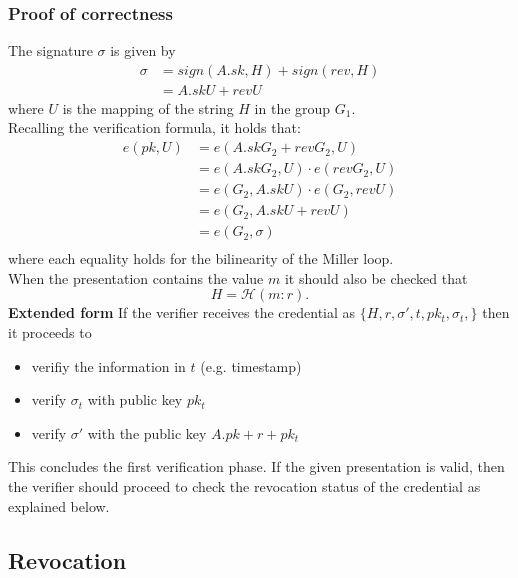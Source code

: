 \subsubsection{Proof of correctness}
The signature $\sigma$ is given by
\begin{equation*}
\begin{split}
    \sigma &= sign(A.sk, H) + sign(rev, H) \\
     &= A.sk U + rev U
\end{split}
\end{equation*}
where $U$ is the mapping of the string $H$ in the group $G_1$.\\
Recalling the verification formula, it holds that:
\begin{equation*}
\begin{split}
 e(pk, U) &= e(A.skG_2 + revG_2, U) \\
 &= e(A.skG_2, U) \cdot e(revG_2, U) \\
 &= e(G_2, A.sk U) \cdot e(G_2, rev U) \\
 &= e(G_2, A.sk U + rev U) \\
 &= e(G_2, \sigma) \\
\end{split}
\end{equation*}
where each equality holds for the bilinearity of the Miller loop.\\
When the presentation contains the value $m$ it should also be checked that
\begin{equation*}
    H = \mathcal{H}(m : r).
\end{equation*}
\textbf{Extended form} If the verifier receives the credential as $\{H, r, \sigma', t, pk_t,  \sigma_t,\}$ then it proceeds to
\begin{itemize}
\item verifiy the information in $t$ (e.g. timestamp)
\item verify $\sigma_t$ with public key $pk_t$
\item verify $\sigma'$ with the public key $A.pk + r + pk_t$
	\end{itemize}

This concludes the first verification phase. If the given presentation
is valid, then the verifier should proceed to check the revocation
status of the credential as explained below.

\subsection{Revocation}

